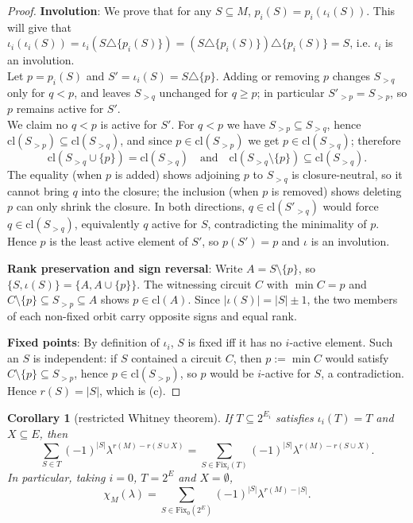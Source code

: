 \documentclass[11pt,a4paper]{article}
\newtheorem{corollary}[theorem]{Corollary}
\theoremstyle{definition}
\newcommand{\Fix}{\mathrm{Fix}}
\newcommand{\cl}{\mathrm{cl}}
\begin{document}
\begin{proof}
\textbf{Involution}: We prove that for any $S \subseteq M$, $p_i(S) = p_i(\iota_i(S))$. This will give that $\iota_i(\iota_i(S)) = \iota_i(S \triangle \{p_i(S)\}) = (S \triangle \{p_i(S)\}) \triangle \{p_i(S)\} = S$, i.e. $\iota_i$ is an involution. \\
Let $p = p_i(S)$ and $S' = \iota_i(S) = S \triangle \{p\}$. Adding or removing $p$ changes $S_{>q}$ only for $q < p$, and leaves $S_{>q}$ unchanged for $q \ge p$; in particular $S'_{>p} = S_{>p}$, so $p$ remains active for $S'$. \\
We claim no $q < p$ is active for $S'$. For $q < p$ we have $S_{>p} \subseteq S_{>q}$, hence $\mathrm{cl}(S_{>p}) \subseteq \mathrm{cl}(S_{>q})$, and since $p \in \mathrm{cl}(S_{>p})$ we get $p \in \mathrm{cl}(S_{>q})$; therefore
\[
\mathrm{cl}(S_{>q} \cup \{p\}) = \mathrm{cl}(S_{>q}) \quad \text{and} \quad \mathrm{cl}(S_{>q} \setminus \{p\}) \subseteq \mathrm{cl}(S_{>q}).
\]
The equality (when $p$ is added) shows adjoining $p$ to $S_{>q}$ is closure-neutral, so it cannot bring $q$ into the closure; the inclusion (when $p$ is removed) shows deleting $p$ can only shrink the closure. In both directions, $q \in \mathrm{cl}(S'_{>q})$ would force $q \in \mathrm{cl}(S_{>q})$, equivalently $q$ active for $S$, contradicting the minimality of $p$. Hence $p$ is the least active element of $S'$, so $p(S') = p$ and $\iota$ is an involution.

\textbf{Rank preservation and sign reversal}: Write $A = S \setminus \{p\}$, so $\{S, \iota (S)\} = \{A, A \cup \{p\}\}$. The witnessing circuit $C$ with $\min C = p$ and $C \setminus \{p\} \subseteq S_{>p} \subseteq A$ shows $p \in \mathrm{cl}(A)$. Since $|\iota (S)| = |S| \pm 1$, the two members of each non-fixed orbit carry opposite signs and equal rank.

\textbf{Fixed points}: By definition of $\iota_i$, $S$ is fixed iff it has no
$i$-active element. Such an $S$ is independent: if $S$ contained a circuit $C$, then
$p:=\min C$ would satisfy $C\setminus\{p\}\subseteq S_{>p}$, hence
$p\in\cl(S_{>p})$, so $p$ would be $i$-active for $S$, a contradiction. Hence
$r(S)=|S|$, which is (c).
\end{proof}

\begin{corollary}[restricted Whitney theorem]\label{cor:whitney}
If $T\subseteq2^{E_i}$ satisfies $\iota_i(T)=T$ and $X\subseteq E$, then
\[
\sum_{S\in T}(-1)^{|S|}\lambda^{r(M)-r(S\cup X)}=\sum_{S\in\Fix_i(T)}(-1)^{|S|}\lambda^{r(M)-r(S\cup X)} .
\]
In particular, taking $i=0$, $T=2^E$ and $X=\emptyset$,
\[
\chi_M(\lambda)=\sum_{S\in\Fix_0(2^E)}(-1)^{|S|}\lambda^{r(M)-|S|}.
\]
\end{corollary}
\end{document}
